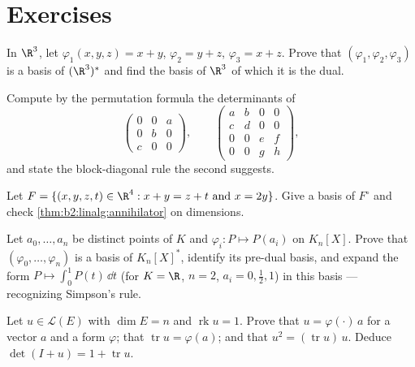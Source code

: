 \section{Exercises}

\begin{exercise}[$\star$]\label{exo:b2:linalg:1}
In $\R^3$, let $\varphi_1(x,y,z) = x + y$, $\varphi_2 = y + z$,
$\varphi_3 = x + z$. Prove that $(\varphi_1, \varphi_2, \varphi_3)$
is a basis of $(\R^3)^*$ and find the basis of $\R^3$ of which it is
the dual.
\end{exercise}

\begin{exercise}[$\star$]\label{exo:b2:linalg:2}
Compute by the permutation formula the determinants of
\[
\begin{pmatrix} 0 & 0 & a\\ 0 & b & 0\\ c & 0 & 0 \end{pmatrix},
\qquad
\begin{pmatrix}
a & b & 0 & 0\\
c & d & 0 & 0\\
0 & 0 & e & f\\
0 & 0 & g & h
\end{pmatrix},
\]
and state the block-diagonal rule the second suggests.
\end{exercise}

\begin{exercise}[$\star$]\label{exo:b2:linalg:3}
Let $F = \{(x,y,z,t) \in \R^4 : x + y = z + t \text{ and } x = 2y\}$.
Give a basis of $F^\circ$ and check
\cref{thm:b2:linalg:annihilator} on dimensions.
\end{exercise}

\begin{exercise}[$\star\star$]\label{exo:b2:linalg:4}
Let $a_0, \dots, a_n$ be distinct points of $K$ and $\varphi_i \colon
P \mapsto P(a_i)$ on $K_n[X]$. Prove that $(\varphi_0, \dots,
\varphi_n)$ is a basis of $K_n[X]^*$, identify its pre-dual basis,
and expand the form $P \mapsto \int_0^1 P(t)\,\dd t$ (for $K = \R$,
$n = 2$, $a_i = 0, \frac12, 1$) in this basis --- recognizing
Simpson's rule.
\end{exercise}

\begin{exercise}[$\star\star$]\label{exo:b2:linalg:5}
Let $u \in \mathcal{L}(E)$ with $\dim E = n$ and $\operatorname{rk} u
= 1$. Prove that $u = \varphi(\cdot)\, a$ for a vector $a$ and a
form $\varphi$; that $\operatorname{tr} u = \varphi(a)$; and that
$u^2 = (\operatorname{tr} u)\, u$. Deduce $\det(I + u) = 1 +
\operatorname{tr} u$.
\end{exercise}

